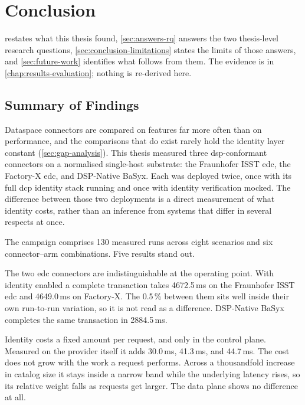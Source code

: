 \chapter{Conclusion}\label{chap:conclusion}

 restates what this thesis found, \cref{sec:answers-rq} answers
the two thesis-level research questions, \cref{sec:conclusion-limitations} states the
limits of those answers, and \cref{sec:future-work} identifies what follows from them. The
evidence is in \cref{chap:results-evaluation}; nothing is re-derived here.


\section{Summary of Findings}\label{sec:summary-findings}

Dataspace connectors are compared on features far more often than on performance, and the
comparisons that do exist rarely hold the identity layer constant
(\cref{sec:gap-analysis}). This thesis measured three \gls{dsp}-conformant connectors on a normalised single-host substrate: the Fraunhofer ISST \gls{edc}, the Factory-X \gls{edc}, and DSP-Native BaSyx. Each was deployed twice, once with its full \gls{dcp} identity stack running and once with identity verification mocked. The difference between
those two deployments is a direct measurement of what identity costs, rather than an
inference from systems that differ in several respects at once.

The campaign comprises 130 measured runs across eight scenarios and six connector--arm
combinations. Five results stand out.

The two \gls{edc} connectors are indistinguishable at the operating point. With identity
enabled a complete transaction takes 4672.5\,ms on the Fraunhofer ISST \gls{edc} and
4649.0\,ms on Factory-X. The 0.5\,\% between them sits well inside their own run-to-run
variation, so it is not read as a difference. DSP-Native BaSyx completes the same
transaction in 2884.5\,ms.

Identity costs a fixed amount per request, and only in the control plane. Measured on the
provider itself it adds 30.0\,ms, 41.3\,ms, and 44.7\,ms. The cost does not grow with the work a request performs. Across a thousandfold increase in catalog size it stays inside a narrow band while the underlying latency rises, so its relative weight falls as requests get larger. The data plane shows no difference at all.


